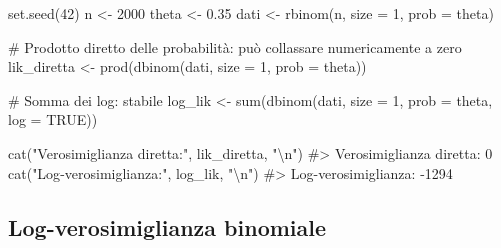 \documentclass[
  italian,
  letterpaper,
  a4paper,
  11pt,
  open=any]{scrbook}
\newenvironment{Shaded}{\begin{snugshade}}{\end{snugshade}}
\newcommand{\AttributeTok}[1]{\textcolor[rgb]{0.40,0.45,0.13}{#1}}
\newcommand{\CommentTok}[1]{\textcolor[rgb]{0.37,0.37,0.37}{#1}}
\newcommand{\ConstantTok}[1]{\textcolor[rgb]{0.56,0.35,0.01}{#1}}
\newcommand{\DecValTok}[1]{\textcolor[rgb]{0.68,0.00,0.00}{#1}}
\newcommand{\FloatTok}[1]{\textcolor[rgb]{0.68,0.00,0.00}{#1}}
\newcommand{\FunctionTok}[1]{\textcolor[rgb]{0.28,0.35,0.67}{#1}}
\newcommand{\NormalTok}[1]{\textcolor[rgb]{0.00,0.23,0.31}{#1}}
\newcommand{\OtherTok}[1]{\textcolor[rgb]{0.00,0.23,0.31}{#1}}
\newcommand{\SpecialCharTok}[1]{\textcolor[rgb]{0.37,0.37,0.37}{#1}}
\newcommand{\StringTok}[1]{\textcolor[rgb]{0.13,0.47,0.30}{#1}}
\theoremstyle{plain}
\theoremstyle{definition}
\theoremstyle{definition}
\theoremstyle{remark}
\begin{document}
\begin{tcolorbox}[enhanced jigsaw, arc=.35mm, bottomrule=.15mm, bottomtitle=1mm, breakable, colback=white, colbacktitle=quarto-callout-caution-color!10!white, colframe=quarto-callout-caution-color-frame, coltitle=black, left=2mm, leftrule=.75mm, opacityback=0, opacitybacktitle=0.6, rightrule=.15mm, title=\textcolor{quarto-callout-caution-color}{\faFire}\hspace{0.5em}{Esempio pratico: underflow e log-verosimiglianza}, titlerule=0mm, toprule=.15mm, toptitle=1mm]

\begin{Shaded}
\begin{Highlighting}[]
\FunctionTok{set.seed}\NormalTok{(}\DecValTok{42}\NormalTok{)}
\NormalTok{n }\OtherTok{\textless{}{-}} \DecValTok{2000}
\NormalTok{theta }\OtherTok{\textless{}{-}} \FloatTok{0.35}
\NormalTok{dati }\OtherTok{\textless{}{-}} \FunctionTok{rbinom}\NormalTok{(n, }\AttributeTok{size =} \DecValTok{1}\NormalTok{, }\AttributeTok{prob =}\NormalTok{ theta)}

\CommentTok{\# Prodotto diretto delle probabilità: può collassare numericamente a zero}
\NormalTok{lik\_diretta }\OtherTok{\textless{}{-}} \FunctionTok{prod}\NormalTok{(}\FunctionTok{dbinom}\NormalTok{(dati, }\AttributeTok{size =} \DecValTok{1}\NormalTok{, }\AttributeTok{prob =}\NormalTok{ theta))}

\CommentTok{\# Somma dei log: stabile}
\NormalTok{log\_lik }\OtherTok{\textless{}{-}} \FunctionTok{sum}\NormalTok{(}\FunctionTok{dbinom}\NormalTok{(dati, }\AttributeTok{size =} \DecValTok{1}\NormalTok{, }\AttributeTok{prob =}\NormalTok{ theta, }\AttributeTok{log =} \ConstantTok{TRUE}\NormalTok{))}

\FunctionTok{cat}\NormalTok{(}\StringTok{"Verosimiglianza diretta:"}\NormalTok{, lik\_diretta, }\StringTok{"}\SpecialCharTok{\textbackslash{}n}\StringTok{"}\NormalTok{)}
\CommentTok{\#\textgreater{} Verosimiglianza diretta: 0}
\FunctionTok{cat}\NormalTok{(}\StringTok{"Log{-}verosimiglianza:"}\NormalTok{, log\_lik, }\StringTok{"}\SpecialCharTok{\textbackslash{}n}\StringTok{"}\NormalTok{)}
\CommentTok{\#\textgreater{} Log{-}verosimiglianza: {-}1294}
\end{Highlighting}
\end{Shaded}

\end{tcolorbox}

\subsection{Log-verosimiglianza
binomiale}\label{log-verosimiglianza-binomiale}
\end{document}
